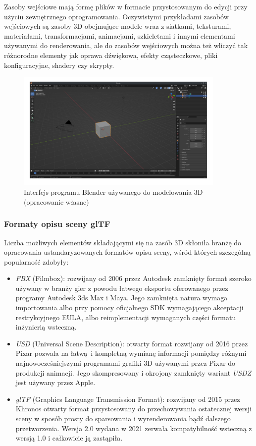 Zasoby wejściowe mają formę plików w formacie przystosowanym do edycji przy użyciu zewnętrznego oprogramowania.
Oczywistymi przykładami zasobów wejściowych są zasoby 3D obejmujące modele wraz z siatkami, teksturami, materiałami, transformacjami, animacjami, szkieletami i innymi elementami używanymi do renderowania, ale do zasobów wejściowych można też wliczyć tak różnorodne elementy jak oprawa dźwiękowa, efekty cząsteczkowe, pliki konfiguracyjne, shadery czy skrypty.
\begin{figure}[htbp]
	\centering
	\includegraphics[width=0.9\textwidth]{images/blender.png}
	\caption{Interfejs programu Blender \cite{BLENDER} używanego do modelowania 3D (opracowanie własne)}
	\label{blendermodel}
\end{figure}


\subsubsection{Formaty opisu sceny glTF}

Liczba możliwych elementów składającymi się na zasób 3D skłoniła branżę do opracowania ustandaryzowanych formatów opisu sceny, wśród których szczególną popularność zdobyły:
\begin{itemize}
	\item \textit{FBX} (Filmbox): rozwijany od 2006 przez Autodesk zamknięty format szeroko używany w branży gier z powodu łatwego eksportu oferowanego przez programy Autodesk 3ds Max i Maya.
	Jego zamknięta natura wymaga importowania albo przy pomocy oficjalnego SDK wymagającego akceptacji restrykcyjnego EULA, albo reimplementacji wymaganych części formatu inżynierią wsteczną.
	\item \textit{USD} (Universal Scene Description): otwarty format rozwijany od 2016 przez Pixar pozwala na łatwą i kompletną wymianę informacji pomiędzy różnymi najnowocześniejszymi programami grafiki 3D używanymi przez Pixar do produkcji animacji.
	Jego skompresowany i okrojony zamknięty wariant \textit{USDZ} jest używany przez Apple.
	\item \textit{glTF} (Graphics Language Transmission Format): rozwijany od 2015 przez Khronos otwarty format przystosowany do przechowywania ostatecznej wersji sceny w sposób prosty do sparsowania i wyrenderowania bądź dalszego przetworzenia.
	Wersja 2.0 wydana w 2021 zerwała kompatybilność wsteczną z wersją 1.0 i całkowicie ją zastąpiła.
\end{itemize}

